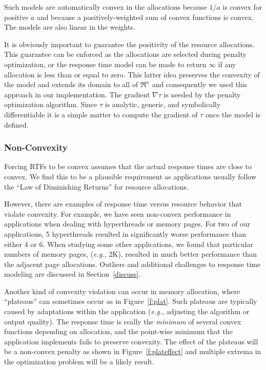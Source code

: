 Such models are automatically convex in the allocations because $1/a$ is convex for positive $a$ and because a positively-weighted sum of convex functions is convex.  The models are also linear in the weights.

It is obviously important to guarantee the positivity of the resource allocations. This guarantee can be enforced as the allocations are selected during penalty optimization, or the response time model can be made to return $\infty$ if any allocation is less than or equal to zero. This latter idea preserves the convexity of the model and extends its domain to all of $\Re^n$ and consequently we used this approach in our implementation.
The gradient $\nabla\tau$ is needed by the penalty optimization algorithm.
Since $\tau$ is analytic, generic, and symbolically differentiable
it is a simple matter to compute the gradient of $\tau$ once the model is defined.

\subsubsection{Non-Convexity}
Forcing RTFs to be convex assumes that the actual response times are
close to convex. We find this to be a plausible requirement as
applications usually follow the ``Law of Diminishing Returns'' for
resource allocations.

However, there are examples of response time versus resource behavior that violate convexity.   For example, we have seen non-convex performance in applications when dealing with hyperthreads or memory pages.  For two of our applications, 5 hyperthreads resulted in significantly worse performance than either 4 or 6.  When studying some other applications, we found that particular numbers of memory pages, (\emph{e.g.,} 2K), resulted in much better performance than the adjacent page allocations.  Outliers and additional challenges to response time modeling are discussed in Section~\ref{discuss}.

Another kind of convexity violation can occur in memory allocation, where ``plateaus'' can sometimes occur as in Figure~\ref{f:plat}. Such plateaus are typically caused by adaptations within the application (\emph{e.g.,} adjusting the algorithm or output quality).
The response time is really the \emph{minimum} of several convex functions depending on allocation, and the point-wise minimum that the application implements fails to preserve convexity.  The effect of the plateaus will be a non-convex penalty as shown in Figure~\ref{f:plateffect} and multiple extrema in the optimization problem will be a likely result. 



